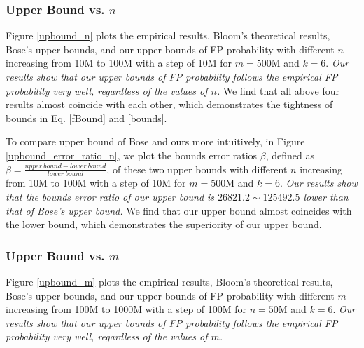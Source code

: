 \subsubsection{Upper Bound vs. $n$}

Figure \ref{upbound_n} plots the empirical results, Bloom's theoretical results, Bose's upper bounds, and our upper bounds of FP probability with different $n$ increasing from 10M to 100M with a step of 10M for $m = 500$M and $k = 6$. 
\textit{Our results show that our upper bounds of FP probability follows the empirical FP probability very well, regardless of the values of $n$.} 
We find that all above four results almost coincide with each other, which demonstrates the tightness of bounds in Eq. \ref{fBound} and \ref{bounds}. 

To compare upper bound of Bose and ours more intuitively, in Figure \ref{upbound_error_ratio_n}, we plot the bounds error ratios $\beta$, defined as $\beta=\frac{upper\ bound - lower\ bound}{lower\ bound}$, of these two upper bounds with different $n$ increasing from 10M to 100M with a step of 10M for $m = 500$M and $k = 6$. 
\textit{Our results show that the bounds error ratio of our upper bound is $26821.2\sim125492.5$ lower than that of Bose's upper bound. }
We find that our upper bound almost coincides with the lower bound, which demonstrates the superiority of our upper bound. 







%
%


\subsubsection{Upper Bound vs. $m$}

Figure \ref{upbound_m} plots the empirical results, Bloom's theoretical results, Bose's upper bounds, and our upper bounds of FP probability with different $m$ increasing from 100M to 1000M with a step of 100M for $n = 50$M and $k = 6$. 
\textit{Our results show that our upper bounds of FP probability follows the empirical FP probability very well, regardless of the values of $m$.} 

